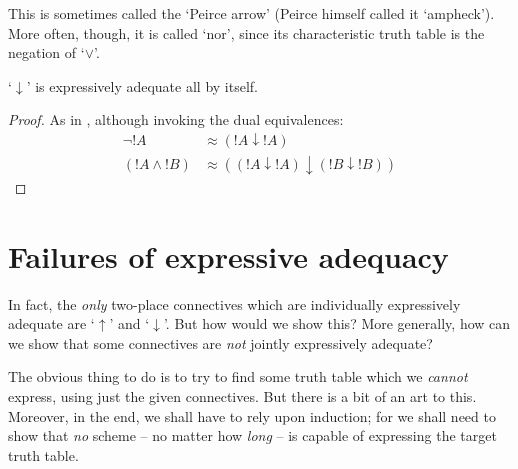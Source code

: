 \documentclass[../../../include/open-logic-section]{subfiles}
\begin{document}
This is sometimes called the `Peirce arrow' (Peirce himself called it `ampheck'). More often, though, it is called `nor', since its characteristic truth table is the negation of `$\lor$'.
	\begin{prop}
	`$\downarrow$' is expressively adequate all by itself. 
	\begin{proof}
	As in , although invoking the dual equivalences:
		\begin{align*}
			\lnot {!A} &\approx ({!A} \downarrow {!A})\\
			({!A} \land {!B}) & \approx (({!A} \downarrow {!A}) \downarrow ({!B} \downarrow {!B}))
		\end{align*}
	\end{proof}
\end{prop}

\section{Failures of expressive adequacy}
 In fact, the \emph{only} two-place connectives which are individually expressively adequate are `$\uparrow$' and `$\downarrow$'. But how would we show this? More generally, how can we show that some connectives are \emph{not} jointly expressively adequate? 
 
The obvious thing to do is to try to find some truth table which we \emph{cannot} express, using just the given connectives. But there is a bit of an art to this. Moreover, in the end, we shall have to rely upon induction; for we shall need to show that \emph{no} scheme -- no matter how \emph{long} -- is capable of expressing the target truth table. 
 
\end{document}
